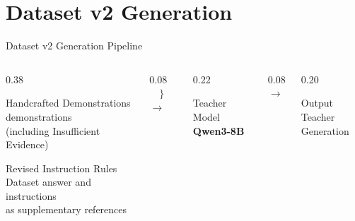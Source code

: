 \section{Dataset v2 Generation}

\begin{frame}{Dataset v2 Generation Pipeline}

\centering
\small

\begin{columns}[c,onlytextwidth]

    \begin{column}{0.38\textwidth}
        \begin{block}{Handcrafted Demonstrations}
             demonstrations\\
            (including Insufficient Evidence)
        \end{block}

        \vspace{0.15cm}

        \begin{block}{Revised Instruction Rules}
            \centering
            Dataset answer and instructions\\
            as supplementary references
        \end{block}
    \end{column}

    \begin{column}{0.08\textwidth}
        \centering
        {\Large $\left.\begin{matrix}\\[0.8cm]\end{matrix}\right\}$}
        {\Large $\longrightarrow$}
    \end{column}

    \begin{column}{0.22\textwidth}
        \begin{block}{Teacher Model}
            \centering
            \textbf{Qwen3-8B}
        \end{block}
    \end{column}

    \begin{column}{0.08\textwidth}
        \centering
        {\Large $\longrightarrow$}
    \end{column}

    \begin{column}{0.20\textwidth}
        \begin{block}{Output}
            \centering
            Teacher Generation
        \end{block}
    \end{column}

\end{columns}

\end{frame}


